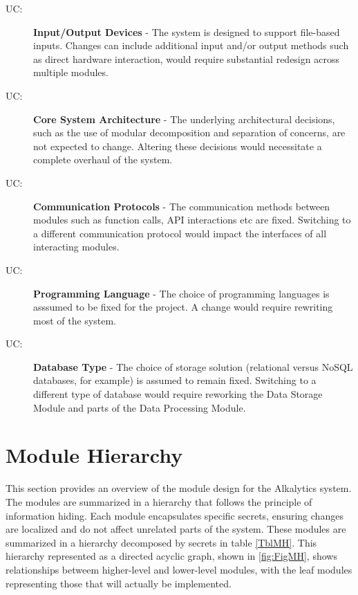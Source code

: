\documentclass[12pt, titlepage]{article}
\newcounter{ucnum}
\newcommand{\uctheucnum}{UC\theucnum}
\begin{document}
\begin{description}
  \item[ \uctheucnum \label{ucIO}:] \textbf{Input/Output Devices} - 
  The system is designed to support file-based inputs. Changes can include additional input
  and/or output methods such as direct hardware interaction, would require substantial
  redesign across multiple modules.
  
  \item[ \uctheucnum \label{ucSysArch}:] \textbf{Core System Architecture} -
  The underlying architectural decisions, such as the use of modular decomposition and separation
  of concerns, are not expected to change. Altering these decisions would necessitate a complete overhaul
  of the system.
  
  \item[ \uctheucnum \label{ucComms}:] \textbf{Communication Protocols} -
  The communication methods between modules such as function calls, API interactions etc are fixed. 
  Switching to a different communication protocol would impact the interfaces of all interacting modules.

  \item[ \uctheucnum \label{ucLanguage}:] \textbf{Programming Language} -
  The choice of programming languages is asssumed to be fixed for the project. A change would
  require rewriting most of the system.

  \item[ \uctheucnum \label{ucDatabase}:] \textbf{Database Type} -
  The choice of storage solution (relational versus NoSQL databases, for example) is assumed to remain
  fixed. Switching to a different type of database would require reworking the Data Storage
  Module and parts of the Data Processing Module.

\end{description}

\section{Module Hierarchy} \label{SecMH}

This section provides an overview of the module design for the Alkalytics system.
The modules are summarized in a hierarchy that follows the principle of information
hiding. Each module encapsulates specific secrets, ensuring changes are localized
and do not affect unrelated parts of the system. These modules are summarized in
a hierarchy decomposed by secrets in table \ref{TblMH}. This hierarchy represented
as a directed acyclic graph, shown in \ref{fig:FigMH}, shows relationships betweem
higher-level and lower-level modules, with the leaf modules representing those that
will actually be implemented.
\end{document}
